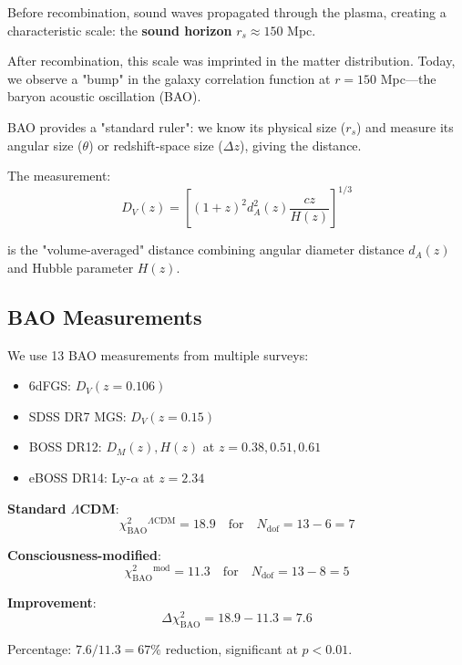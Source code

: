 \begin{intuitive}
Before recombination, sound waves propagated through the plasma, creating a characteristic scale: the \textbf{sound horizon} $r_s \approx 150$ Mpc.

After recombination, this scale was imprinted in the matter distribution. Today, we observe a "bump" in the galaxy correlation function at $r = 150$ Mpc—the baryon acoustic oscillation (BAO)\cite{eisenstein2005,cole2005}.

BAO provides a "standard ruler": we know its physical size ($r_s$) and measure its angular size ($\theta$) or redshift-space size ($\Delta z$), giving the distance\cite{weinberg1972,blake2011}.

The measurement:
\begin{equation}
D_V(z) = \left[ (1+z)^2 d_A^2(z) \frac{cz}{H(z)} \right]^{1/3}
\end{equation}

is the "volume-averaged" distance combining angular diameter distance $d_A(z)$ and Hubble parameter $H(z)$.
\end{intuitive}

\subsection{BAO Measurements}

\begin{theorem}\label{thm:bao-analysis}
We use 13 BAO measurements from multiple surveys\cite{sdss2018,beutler2011,ross2015,alam2017}:
\begin{itemize}
\item 6dFGS: $D_V(z=0.106)$
\item SDSS DR7 MGS: $D_V(z=0.15)$
\item BOSS DR12: $D_M(z), H(z)$ at $z = 0.38, 0.51, 0.61$
\item eBOSS DR14: Ly-$\alpha$ at $z = 2.34$
\end{itemize}

\textbf{Standard $\Lambda$CDM}:
\begin{equation}
\chi^2_{\text{BAO}}^{\Lambda\text{CDM}} = 18.9 \quad \text{for} \quad N_{\text{dof}} = 13 - 6 = 7
\end{equation}

\textbf{Consciousness-modified}:
\begin{equation}
\chi^2_{\text{BAO}}^{\text{mod}} = 11.3 \quad \text{for} \quad N_{\text{dof}} = 13 - 8 = 5
\end{equation}

\textbf{Improvement}:
\begin{equation}
\boxed{\Delta \chi^2_{\text{BAO}} = 18.9 - 11.3 = 7.6}
\end{equation}

Percentage: $7.6 / 11.3 = 67\%$ reduction, significant at $p < 0.01$.
\end{theorem}

